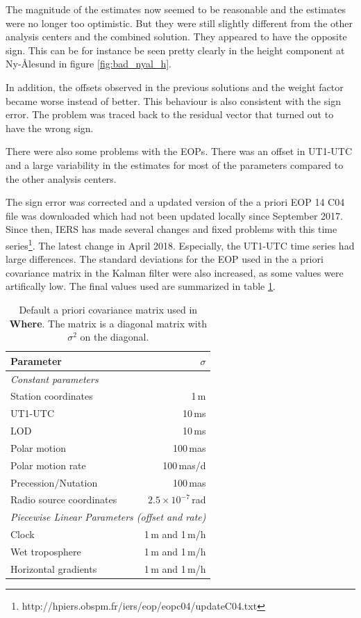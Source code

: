 \documentclass[twocolumn,twoside]{svmultivs_gm} %
\begin{document}
The magnitude of the estimates now seemed to be reasonable and the estimates were no longer too optimistic. But they
were still slightly different from the other analysis centers and the combined solution. They appeared to have the opposite
sign. This can be for instance be seen pretty clearly in the height component at Ny-{\AA}lesund in figure
\ref{fig:bad_nyal_h}.

In addition, the offsets observed in the previous solutions and the weight factor became worse instead of better. This
behaviour is also consistent with the sign error. The problem was traced back to the residual vector that
turned out to have the wrong sign.

There were also some problems with the EOPs. There was an offset in UT1-UTC and a large variability in the estimates for
most of the parameters compared to the other analysis centers.

The sign error was corrected and a updated version of the a priori EOP 14 C04 file was downloaded which had not been
updated locally since September 2017. Since then, IERS has made several changes and fixed problems with this time
series\footnote{http://hpiers.obspm.fr/iers/eop/eopc04/updateC04.txt}. The latest change in April 2018. Especially,
the UT1-UTC time series had large differences. The standard deviations for the EOP used in the a priori covariance matrix in the Kalman filter were also
increased, as some values were artifically low. The final values used are summarized in table \ref{tbl:sigmas}.

\begin{table}[!htbp]
\caption{Default a priori covariance matrix used in \textbf{Where}. The matrix is a diagonal matrix with $\sigma^2$ on the diagonal.}
\begin{tabularx}{\columnwidth}{X|r}
\hline
\textbf{Parameter} & $\sigma$ \\
\hline
\multicolumn{2}{l}{\textit{Constant parameters}} \\
\hline
Station coordinates      & 1\,m \\
UT1-UTC                  & 10\,ms \\
LOD                      & 10\,ms \\
Polar motion             & 100\,mas \\
Polar motion rate        & 100\,mas/d \\
Precession/Nutation      & 100\,mas \\
Radio source coordinates & $2.5\times 10^{-7}$\,rad \\
\hline
\multicolumn{2}{l}{\textit{Piecewise Linear Parameters (offset and rate)}} \\
\hline
Clock                   & 1\,m and 1\,m/h\\
Wet troposphere         & 1\,m and 1\,m/h \\
Horizontal gradients    & 1\,m and 1\,m/h \\
\hline
\end{tabularx}
\label{tbl:sigmas}
\end{table}
\end{document}
